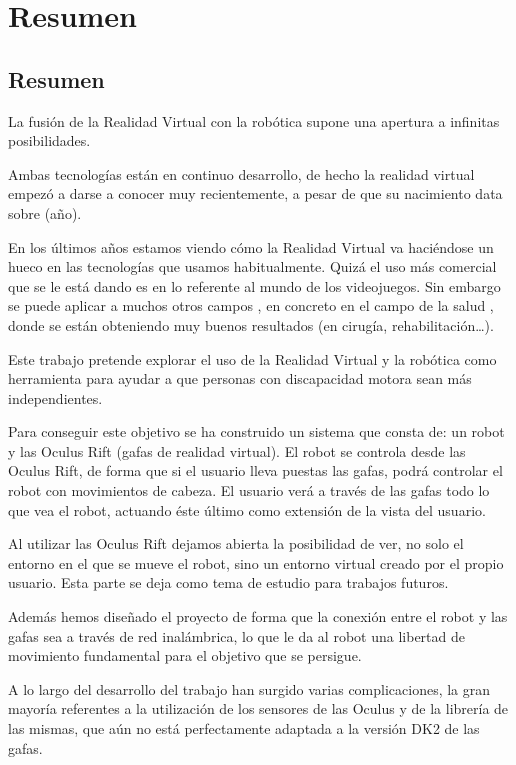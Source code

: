 \chapter*{Resumen}

\section*{Resumen}
La fusión de la Realidad Virtual con la robótica supone una apertura a infinitas posibilidades. 

Ambas tecnologías están en continuo desarrollo, de hecho la realidad virtual empezó a darse a conocer muy recientemente, a pesar de que su nacimiento data sobre  (año).

En los últimos años estamos viendo cómo la Realidad Virtual va haciéndose un hueco en las tecnologías que usamos habitualmente. Quizá el uso más comercial que se le está dando es en lo referente al mundo de los videojuegos.
Sin embargo se puede aplicar a muchos otros campos , en concreto en el campo de la salud , donde se están obteniendo muy buenos resultados (en cirugía, rehabilitación…).

Este trabajo pretende explorar el uso de la Realidad Virtual y la robótica como herramienta para ayudar a que personas con discapacidad motora sean más independientes.

Para conseguir este objetivo se ha construido un sistema que consta de: un robot y las Oculus Rift (gafas de realidad virtual).
El robot se controla desde las Oculus Rift, de forma que si el usuario lleva puestas las gafas, podrá controlar el robot con movimientos de cabeza.
El usuario verá a través de las gafas todo lo que vea el robot, actuando éste último como extensión de la vista del usuario.

Al utilizar las Oculus Rift dejamos abierta la posibilidad de ver, no solo el entorno en el que se mueve el robot, sino un entorno virtual creado por el propio usuario. Esta parte se deja como tema de estudio para trabajos futuros.

Además hemos diseñado el proyecto de forma que la conexión entre el robot y las gafas sea a través de red inalámbrica, lo que le da al robot una libertad de movimiento fundamental para el objetivo que se persigue.

A lo largo del desarrollo del trabajo han surgido varias complicaciones, la gran mayoría referentes a la utilización de los sensores de las Oculus y de la librería de las mismas, que aún no está perfectamente adaptada a la versión DK2 de las gafas.

